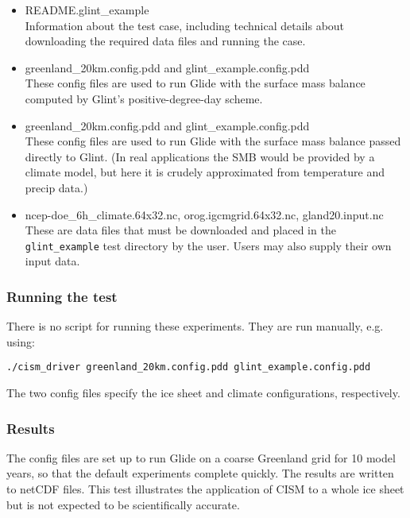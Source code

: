 \begin{itemize}
	\item README.glint\_example \\
         Information about the test case, including technical details about downloading the required data files
         and running the case.
  	\item greenland\_20km.config.pdd and glint\_example.config.pdd \\
  	 These config files are used to run Glide with the surface mass balance computed by Glint's positive-degree-day scheme.
  	\item greenland\_20km.config.pdd and glint\_example.config.pdd \\
  	 These config files are used to run Glide with the surface mass balance passed directly to Glint.
         (In real applications the SMB would be provided by a climate model, but here it is crudely approximated from
         temperature and precip data.)
  	\item  ncep-doe\_6h\_climate.64x32.nc, orog.igcmgrid.64x32.nc, gland20.input.nc \\
    	 These are data files that must be downloaded and placed in the \texttt{glint\_example} test directory by the user.
         Users may also supply their own input data.
\end{itemize}

\subsubsection{Running the test}
There is no script for running these experiments. They are run manually, e.g. using: 

\texttt{./cism\_driver greenland\_20km.config.pdd glint\_example.config.pdd}

The two config files specify the ice sheet and climate configurations, respectively. 

\subsubsection{Results}

The config files are set up to run Glide on a coarse Greenland grid for 10 model years,
so that the default experiments complete quickly.  The results are written to netCDF files.
This test illustrates the application of CISM to a whole ice sheet but is not expected
to be scientifically accurate.


